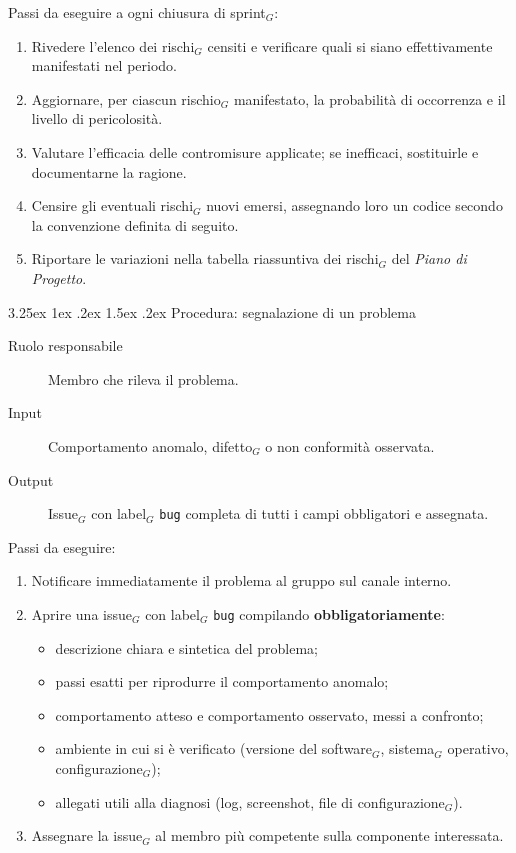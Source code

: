\documentclass[a4paper, 10pt]{article}
\makeatletter
\renewcommand\paragraph{\@startsection{paragraph}{4}{\z@}%
  {3.25ex \@plus1ex \@minus .2ex}%
  {1.5ex \@plus .2ex}%
  {\normalfont\normalsize\bfseries}}
\makeatother
\begin{document}
\noindent Passi da eseguire a ogni chiusura di sprint$_G$:
\begin{enumerate}
    \item Rivedere l'elenco dei rischi$_G$ censiti e verificare quali si siano effettivamente manifestati nel periodo.
    \item Aggiornare, per ciascun rischio$_G$ manifestato, la probabilità di occorrenza e il livello di pericolosità.
    \item Valutare l'efficacia delle contromisure applicate; se inefficaci, sostituirle e documentarne la ragione.
    \item Censire gli eventuali rischi$_G$ nuovi emersi, assegnando loro un codice secondo la convenzione definita di seguito.
    \item Riportare le variazioni nella tabella riassuntiva dei rischi$_G$ del \emph{Piano di Progetto}.
\end{enumerate}

\paragraph{Procedura: segnalazione di un problema}

\begin{description}
    \item[Ruolo responsabile] Membro che rileva il problema.
    \item[Input] Comportamento anomalo, difetto$_G$ o non conformità osservata.
    \item[Output] Issue$_G$ con label$_G$ \texttt{bug} completa di tutti i campi obbligatori e assegnata.
\end{description}

\noindent Passi da eseguire:
\begin{enumerate}
    \item Notificare immediatamente il problema al gruppo sul canale interno.
    \item Aprire una issue$_G$ con label$_G$ \texttt{bug} compilando \textbf{obbligatoriamente}:
    \begin{itemize}
        \item descrizione chiara e sintetica del problema;
        \item passi esatti per riprodurre il comportamento anomalo;
        \item comportamento atteso e comportamento osservato, messi a confronto;
        \item ambiente in cui si è verificato (versione del software$_G$, sistema$_G$ operativo, configurazione$_G$);
        \item allegati utili alla diagnosi (log, screenshot, file di configurazione$_G$).
    \end{itemize}
    \item Assegnare la issue$_G$ al membro più competente sulla componente interessata.
\end{enumerate}
\end{document}
